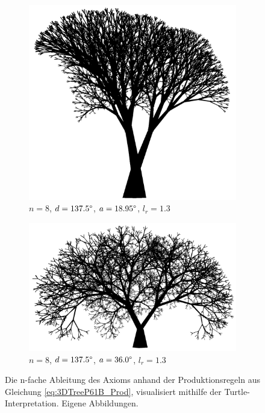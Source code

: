 	\cite[S.60]{ABOP:04} 
\begin{figure} [hbtp]
	\centering
	\begin{subfigure}[t]{.8\textwidth}
		\centering
		\includegraphics[width=\linewidth]{images/3DTreeP61B_Angle_18_95.png}
		\caption{$n=8$, $d=137.5\degree$, $a=18.95\degree$, $l_r=1.3$}
		\label{fig:3DTreeP61B_Angle_18_95}
	\end{subfigure}
	\begin{subfigure}[t]{.8\textwidth}
		\centering
		\includegraphics[width=\linewidth]{images/3DTreeP61B_Angle_36.png}
		\caption{$n=8$, $d=137.5\degree$, $a=36.0\degree$, $l_r=1.3$}
		\label{fig:3DTreeP61B_Angle_36}
	\end{subfigure}
	\caption{Die n-fache Ableitung des Axioms anhand der Produktionsregeln aus Gleichung \ref{eq:3DTreeP61B_Prod}, visualisiert mithilfe der Turtle-Interpretation. Eigene Abbildungen.}
	\label{fig:BranchingLSystems3D}
\end{figure}

